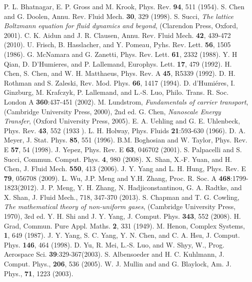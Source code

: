 \documentclass[doublecol]{epl2}
\begin{document}
\begin{thebibliography}{0}

 P. L. Bhatnagar, E. P. Gross and M. Krook, Phys. Rev. {\bf 94}, 511 (1954).
 S. Chen and G. Doolen, Annu. Rev. Fluid Mech. {\bf 30}, 329 (1998).
 S. Succi, {\sl The lattice Boltzmann equation for fluid dynamics and beyond}, (Clarendon Press, Oxford, 2001).
 C. K. Aidun and J. R. Clausen, Annu. Rev. Fluid Mech. {\bf 42}, 439-472 (2010).
 U. Frisch, B. Hasslacher, and Y. Pomeau, Pyhs. Rev. Lett. {\bf 56}, 1505 (1986).
 G. McNamara and G. Zanetti, Phys. Rev. Lett. {\bf 61}, 2332 (1988).
 Y. H Qian, D. D'Humieres, and P. Lallemand, Europhys. Lett. {\bf 17}, 479 (1992).
 H. Chen, S. Chen, and W. H. Matthaeus, Phys. Rev. A {\bf 45}, R5339 (1992).
 D. H. Rothman and S. Zaleski, Rev. Mod. Phys. {\bf 66}, 1417 (1994).
 D. d'Humi\'{e}res, I. Ginzburg, M. Krafczyk, P. Lallemand, and L.-S. Luo, Philo. Trans. R. Soc. London A {\bf 360}:437-451 (2002).
 M. Lundstrom, {\sl Fundamentals of carrier transport}, (Cambridge University Press, 2000), 2nd ed.
 G. Chen, {\sl Nanoscale Energy Transfer}, (Oxford University Press, 2005).
 E. A. Uehling and G. E. Uhlenbeck, Phys. Rev. {\bf 43}, 552 (1933 ).
 L. H. Holway, Phys. Fluids {\bf 21}:593-630 (1966).
 D. A. Meyer, J. Stat. Phys. {\bf 85}, 551 (1996).
 B.M. Boghosian and W. Taylor, Phys. Rev. E {\bf 57}, 54 (1998).
 J. Yepez, Phys. Rev. E {\bf 63}, 046702 (2001).
 S. Palpacelli and S. Succi, Commun. Comput. Phys. {\bf 4}, 980 (2008).
 X. Shan, X.-F. Yuan, and H. Chen, J. Fluid Mech. {\bf 550}, 413 (2006).
 J. Y. Yang and L. H. Hung, Phys. Rev. E {\bf 79}, 056708 (2009).
 L. Wu, J.P. Meng  and Y.H. Zhang, Proc. R. Soc. A {\bf 468}:1799-1823(2012).
 J. P. Meng, Y. H. Zhang, N. Hadjiconstantinou, G. A. Radtke, and X. Shan, J. Fluid Mech., 718, 347-370 (2013).
 S. Chapman and  T. G. Cowling, {\sl The mathematical theory of non-uniform gases}, (Cambridge University Press, 1970), 3rd ed.
 Y. H. Shi and J. Y. Yang, J. Comput. Phys. {\bf 343}, 552 (2008).
 H. Grad, Commun. Pure Appl. Maths. {\bf 2}, 331 (1949).
 M. Henon, Complex Systems, {\bf 1}, 649 (1987).
 J. Y. Yang, S. C. Yang, Y. N. Chen, and C. A. Hsu, J. Comput. Phys. {\bf 146}, 464 (1998).
 D. Yu, R. Mei, L.-S. Luo, and W. Shyy, W., Prog. Aerospace Sci. {\bf 39}:329-367(2003).
 S. Albensoeder and H. C. Kuhlmann, J. Comput. Phys., {\bf 206}, 536 (2005).
 W. J. Mullin and and G. Blaylock, Am. J. Phys., {\bf 71}, 1223 (2003).

\end{thebibliography}
\end{document}
